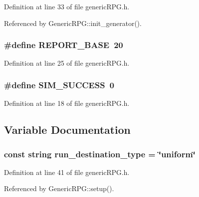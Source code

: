 Definition at line 33 of file genericRPG.h.

Referenced by GenericRPG::init\_\-generator().
\subsubsection[{REPORT\_\-BASE}]{\setlength{\rightskip}{0pt plus 5cm}\#define REPORT\_\-BASE~20}\label{genericRPG_8h_acd7d711d1cb6daa442b1020836b7b10}




Definition at line 25 of file genericRPG.h.
\subsubsection[{SIM\_\-SUCCESS}]{\setlength{\rightskip}{0pt plus 5cm}\#define SIM\_\-SUCCESS~0}\label{genericRPG_8h_7ff63f71612b54bc3472788c5cf858a8}




Definition at line 18 of file genericRPG.h.

\subsection{Variable Documentation}
\subsubsection[{run\_\-destination\_\-type}]{\setlength{\rightskip}{0pt plus 5cm}const string {\bf run\_\-destination\_\-type} = \char`\"{}uniform\char`\"{}}\label{genericRPG_8h_d2814df802952bf7d5e54b28efc5d6c5}




Definition at line 41 of file genericRPG.h.

Referenced by GenericRPG::setup().